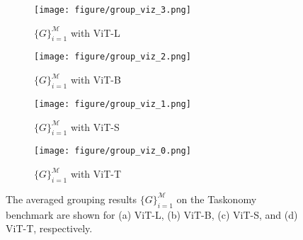 \begin{figure}[h]
    \vspace{-10pt}
    \centering
    \begin{subfigure}{0.24\textwidth}
        \texttt{[image: figure/group\_viz\_3.png]}
        \vspace*{-15pt}
        \caption{$\{G\}_{i=1}^{\mathcal{M}}$ with ViT-L}
    \end{subfigure}
    \begin{subfigure}{0.24\textwidth}
        \texttt{[image: figure/group\_viz\_2.png]}
        \vspace*{-15pt}
        \caption{$\{G\}_{i=1}^{\mathcal{M}}$ with ViT-B}
    \end{subfigure}
    \begin{subfigure}{0.24\textwidth}
        \texttt{[image: figure/group\_viz\_1.png]}
        \vspace*{-15pt}
        \caption{$\{G\}_{i=1}^{\mathcal{M}}$ with ViT-S}
    \end{subfigure}
    \begin{subfigure}{0.24\textwidth}
        \texttt{[image: figure/group\_viz\_0.png]}
        \vspace*{-15pt}
        \caption{$\{G\}_{i=1}^{\mathcal{M}}$ with ViT-T}
    \end{subfigure}
    \caption{The averaged grouping results $\{G\}_{i=1}^{\mathcal{M}}$ on the Taskonomy benchmark are shown for (a) ViT-L, (b) ViT-B, (c) ViT-S, and (d) ViT-T, respectively.}
    \label{append:fig:vis_grouping}
\end{figure}

